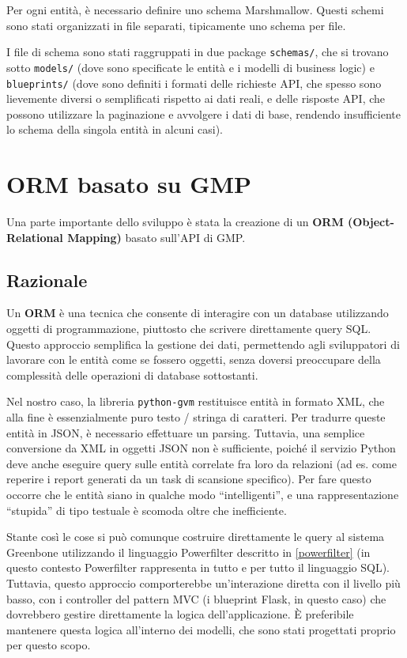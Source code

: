 Per ogni entità, è necessario definire uno schema Marshmallow. Questi schemi sono stati organizzati in file separati, tipicamente uno schema per file.

I file di schema sono stati raggruppati in due package \texttt{schemas/}, che si trovano sotto \texttt{models/} (dove sono specificate le entità e i modelli di business logic) e \texttt{blueprints/} (dove sono definiti i formati delle richieste API, che spesso sono lievemente diversi o semplificati rispetto ai dati reali, e delle risposte API, che possono utilizzare la paginazione e avvolgere i dati di base, rendendo insufficiente lo schema della singola entità in alcuni casi).

\section{ORM basato su GMP}
Una parte importante dello sviluppo è stata la creazione di un \textbf{ORM (Object-Relational Mapping)} basato sull'API di GMP.

\subsection{Razionale}
Un \textbf{ORM} è una tecnica che consente di interagire con un database utilizzando oggetti di programmazione, piuttosto che scrivere direttamente query SQL. Questo approccio semplifica la gestione dei dati, permettendo agli sviluppatori di lavorare con le entità come se fossero oggetti, senza doversi preoccupare della complessità delle operazioni di database sottostanti.

Nel nostro caso, la libreria \texttt{python-gvm} restituisce entità in formato XML, che alla fine è essenzialmente puro testo / stringa di caratteri. Per tradurre queste entità in JSON, è necessario effettuare un parsing. Tuttavia, una semplice conversione da XML in oggetti JSON non è sufficiente, poiché il servizio Python deve anche eseguire query sulle entità correlate fra loro da relazioni (ad es. come reperire i report generati da un task di scansione specifico). Per fare questo occorre che le entità siano in qualche modo ``intelligenti'', e una rappresentazione ``stupida'' di tipo testuale è scomoda oltre che inefficiente.

Stante così le cose si può comunque costruire direttamente le query al sistema Greenbone utilizzando il linguaggio Powerfilter descritto in \ref{powerfilter} (in questo contesto Powerfilter rappresenta in tutto e per tutto il linguaggio SQL). Tuttavia, questo approccio comporterebbe un'interazione diretta con il livello più basso, con i controller del pattern MVC (i blueprint Flask, in questo caso) che dovrebbero gestire direttamente la logica dell'applicazione. È preferibile mantenere questa logica all'interno dei modelli, che sono stati progettati proprio per questo scopo.

